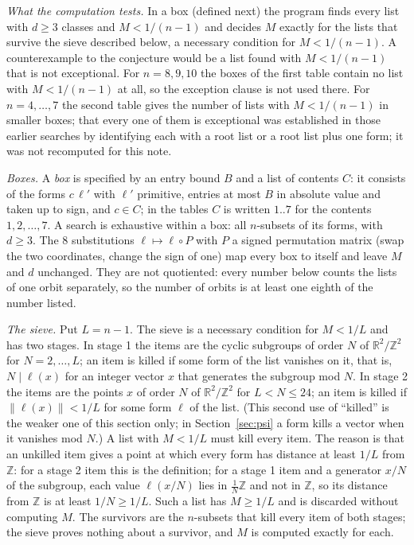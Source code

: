 \documentclass[11pt]{amsart}
\theoremstyle{definition}
\theoremstyle{remark}
\newcommand{\R}{\mathbb{R}}
\newcommand{\Z}{\mathbb{Z}}
\newcommand{\dist}[1]{\lVert #1\rVert}
\begin{document}
\emph{What the computation tests.} In a box (defined next) the program finds every list with $d\ge3$ classes and $M<1/(n-1)$ and decides $M$ exactly for the lists that survive the sieve described below, a necessary condition for $M<1/(n-1)$. A counterexample to the conjecture would be a list found with $M<1/(n-1)$ that is not exceptional. For $n=8,9,10$ the boxes of the first table contain no list with $M<1/(n-1)$ at all, so the exception clause is not used there. For $n=4,\dots,7$ the second table gives the number of lists with $M<1/(n-1)$ in smaller boxes; that every one of them is exceptional was established in those earlier searches by identifying each with a root list or a root list plus one form; it was not recomputed for this note.

\emph{Boxes.} A \emph{box} is specified by an entry bound $B$ and a list of contents $C$: it consists of the forms $c\,\ell'$ with $\ell'$ primitive, entries at most $B$ in absolute value and taken up to sign, and $c\in C$; in the tables $C$ is written $1..7$ for the contents $1,2,\dots,7$. A search is exhaustive within a box: all $n$-subsets of its forms, with $d\ge3$. The $8$ substitutions $\ell\mapsto\ell\circ P$ with $P$ a signed permutation matrix (swap the two coordinates, change the sign of one) map every box to itself and leave $M$ and $d$ unchanged. They are not quotiented: every number below counts the lists of one orbit separately, so the number of orbits is at least one eighth of the number listed.

\emph{The sieve.} Put $L=n-1$. The sieve is a necessary condition for $M<1/L$ and has two stages. In stage 1 the items are the cyclic subgroups of order $N$ of $\R^2/\Z^2$ for $N=2,\dots,L$; an item is killed if some form of the list vanishes on it, that is, $N\mid\ell(x)$ for an integer vector $x$ that generates the subgroup mod $N$. In stage 2 the items are the points $x$ of order $N$ of $\R^2/\Z^2$ for $L<N\le24$; an item is killed if $\dist{\ell(x)}<1/L$ for some form $\ell$ of the list. (This second use of ``killed'' is the weaker one of this section only; in Section~\ref{sec:psi} a form kills a vector when it vanishes mod $N$.) A list with $M<1/L$ must kill every item. The reason is that an unkilled item gives a point at which every form has distance at least $1/L$ from $\Z$: for a stage 2 item this is the definition; for a stage 1 item and a generator $x/N$ of the subgroup, each value $\ell(x/N)$ lies in $\frac1N\Z$ and not in $\Z$, so its distance from $\Z$ is at least $1/N\ge1/L$. Such a list has $M\ge1/L$ and is discarded without computing $M$. The survivors are the $n$-subsets that kill every item of both stages; the sieve proves nothing about a survivor, and $M$ is computed exactly for each.
\end{document}
